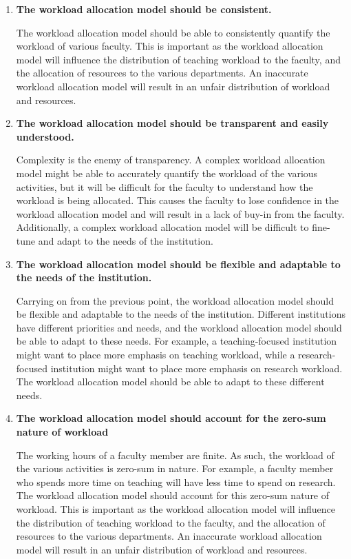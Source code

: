 \begin{enumerate}

  \item \textbf{The workload allocation model should be consistent.}

        The workload allocation model should be able to consistently quantify the workload of various faculty. This is important as the workload allocation model will influence the distribution of teaching workload to the faculty, and the allocation of resources to the various departments. An inaccurate workload allocation model will result in an unfair distribution of workload and resources.

  \item \textbf{The workload allocation model should be transparent and easily understood.}

        Complexity is the enemy of transparency. A complex workload allocation model might be able to accurately quantify the workload of the various activities, but it will be difficult for the faculty to understand how the workload is being allocated. This causes the faculty to lose confidence in the workload allocation model and will result in a lack of buy-in from the faculty. Additionally, a complex workload allocation model will be difficult to fine-tune and adapt to the needs of the institution.

  \item \textbf{The workload allocation model should be flexible and adaptable to the needs of the institution.}

        Carrying on from the previous point, the workload allocation model should be flexible and adaptable to the needs of the institution. Different institutions have different priorities and needs, and the workload allocation model should be able to adapt to these needs. For example, a teaching-focused institution might want to place more emphasis on teaching workload, while a research-focused institution might want to place more emphasis on research workload. The workload allocation model should be able to adapt to these different needs.

  \item \textbf{The workload allocation model should account for the zero-sum nature of workload}

        The working hours of a faculty member are finite. As such, the workload of the various activities is zero-sum in nature. For example, a faculty member who spends more time on teaching will have less time to spend on research. The workload allocation model should account for this zero-sum nature of workload. This is important as the workload allocation model will influence the distribution of teaching workload to the faculty, and the allocation of resources to the various departments. An inaccurate workload allocation model will result in an unfair distribution of workload and resources.


\end{enumerate}
